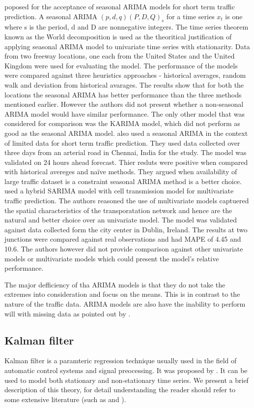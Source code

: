 \citet{williams2003modeling} poposed for the acceptance of seasonal ARIMA models for short term
traffic prediction. A seasonal ARIMA $(p,d,q) (P,D,Q)_{s}$ for a time series {$x_{t}$} is one
where s is the period, d and D are nonnegative integers. The time series theorem known as the World
decomposition is used as the theoritical justification of applying seasonal ARIMA model to
univariate time series with stationarity. Data from two freeway locations, one each from the
United States and the United Kingdom were used for evaluating the model. The performance of the
models were compared against three heuristics approaches - historical averages, random walk and
deviation from historical avarages. The results show that for both the locations the seasonal
ARIMA has better performance than the three methods mentioned earlier. However the authors did
not present whether a non-seasonal ARIMA model would have similar performance. The only other
model that was considered for comparison was the KARIMA model, which did not perform as good as
the seasonal ARIMA model. \citet{kumar2015short} also used a seasonal ARIMA in the context of
limited data for short term traffic prediction. They used data collected over three days from an
arterial road in Chennai, India for the study. The model was validated on 24 hours ahead forecast.
Thier resluts were positive when compared with historical avereges and naïve methods. They
argued when availability of large traffic dataset is a constraint seasonal ARIMA method is a
better choice. \citet{szeto2009multivariate} used a hybrid SARIMA model with cell transmission
model for multivariate traffic prediction. The authors reasoned the use of multivariate models
captuered the spatial characteristics of the transporatation network and hence are the natural
and better choice over an univariate model. The model was validated against data collected form
the city center in Dublin, Ireland. The results at two junctions were compared against real
observations and had MAPE of 4.45 and 10.6. The authors however did not provide comparison
against other univariate models or multivariate models which could present the model's relative
performance.

The major defficiency of tha ARIMA models is that they do not take the extremes into
consideration and focus on the means. This is in contrast to the nature of the traffic data.
ARIMA models are also have the inability to perform will with missing data as pointed out by
\citet{smith1997traffic}.


\subsection{Kalman filter}
Kalman filter is a paramteric regression technique usually used in the field of automatic control
systems and signal preocessing. It was proposed by \citet{kalman1960new}. It can be used to model
both stationary and non-stationary time series. We present a brief description of this theory, for
detail understanding the reader should refer to some extensive literature (such as
\citet{harvey1990forecasting}  and \citet{haykin2001kalman}).

